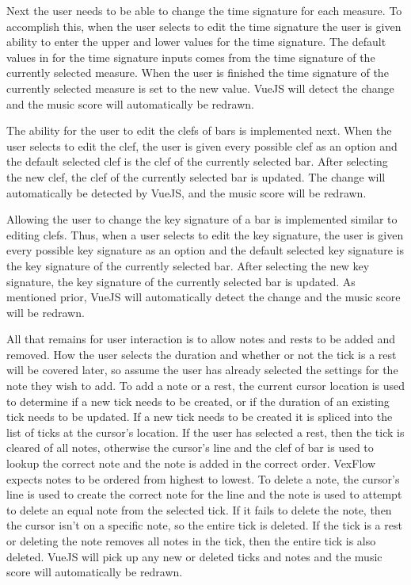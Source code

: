 \documentclass[letterpaper,12pt]{article}
\begin{document}
Next the user needs to be able to change the time signature for each measure. To accomplish this, when the user selects
to edit the time signature the user is given ability to enter the upper and lower values for the time signature. The
default values in for the time signature inputs comes from the time signature of the currently selected measure. When
the user is finished the time signature of the currently selected measure is set to the new value. VueJS will detect the
change and the music score will automatically be redrawn.

The ability for the user to edit the clefs of bars is implemented next. When the user selects to edit the clef, the
user is given every possible clef as an option and the default selected clef is the clef of the currently selected bar.
After selecting the new clef, the clef of the currently selected bar is updated. The change will automatically be
detected by VueJS, and the music score will be redrawn.

Allowing the user to change the key signature of a bar is implemented similar to editing clefs. Thus, when a user
selects to edit the key signature, the user is given every possible key signature as an option and the default selected
key signature is the key signature of the currently selected bar. After selecting the new key signature, the key
signature of the currently selected bar is updated. As mentioned prior, VueJS will automatically detect the change and
the music score will be redrawn.

All that remains for user interaction is to allow notes and rests to be added and removed. How the user selects the
duration and whether or not the tick is a rest will be covered later, so assume the user has already selected the
settings for the note they wish to add. To add a note or a rest, the current cursor location is used to determine if a
new tick needs to be created, or if the duration of an existing tick needs to be updated. If a new tick needs to be
created it is spliced into the list of ticks at the cursor's location. If the user has selected a rest, then the tick
is cleared of all notes, otherwise the cursor's line and the clef of bar is used to lookup the correct note and the note
is added in the correct order. VexFlow expects notes to be ordered from highest to lowest. To delete a note, the
cursor's line is used to create the correct note for the line and the note is used to attempt to delete an equal note
from the selected tick. If it fails to delete the note, then the cursor isn't on a specific note, so the entire tick is
deleted. If the tick is a rest or deleting the note removes all notes in the tick, then the entire tick is also deleted.
VueJS will pick up any new or deleted ticks and notes and the music score will automatically be redrawn.
\end{document}
